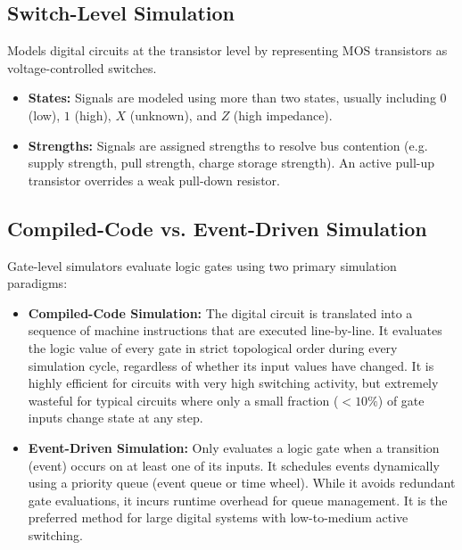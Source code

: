 \documentclass[12pt,a4paper]{article}
\begin{document}
\subsection{Switch-Level Simulation}
Models digital circuits at the transistor level by representing MOS transistors as voltage-controlled switches.
\begin{itemize}[leftmargin=*, itemsep=2pt]
  \item \textbf{States:} Signals are modeled using more than two states, usually including $0$ (low), $1$ (high), $X$ (unknown), and $Z$ (high impedance).
  \item \textbf{Strengths:} Signals are assigned strengths to resolve bus contention (e.g. supply strength, pull strength, charge storage strength). An active pull-up transistor overrides a weak pull-down resistor.
\end{itemize}

\subsection{Compiled-Code vs. Event-Driven Simulation}
Gate-level simulators evaluate logic gates using two primary simulation paradigms:
\begin{itemize}[leftmargin=*, itemsep=3pt]
  \item \textbf{Compiled-Code Simulation:} The digital circuit is translated into a sequence of machine instructions that are executed line-by-line. It evaluates the logic value of every gate in strict topological order during every simulation cycle, regardless of whether its input values have changed. It is highly efficient for circuits with very high switching activity, but extremely wasteful for typical circuits where only a small fraction ($<10\%$) of gate inputs change state at any step.
  \item \textbf{Event-Driven Simulation:} Only evaluates a logic gate when a transition (event) occurs on at least one of its inputs. It schedules events dynamically using a priority queue (event queue or time wheel). While it avoids redundant gate evaluations, it incurs runtime overhead for queue management. It is the preferred method for large digital systems with low-to-medium active switching.
\end{itemize}
\end{document}
